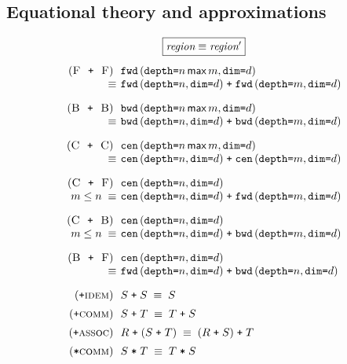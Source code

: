 \documentclass[9pt]{sigplanconf}
\theoremstyle{definition}
\newcommand{\term}[1]{\texttt{#1}}
\newcommand{\stenFwdS}[2]{\term{fwd} \, (\term{depth=}#1,
  \term{dim=}#2)}
\newcommand{\stenBwdS}[2]{\term{bwd} \, (\term{depth=}#1,
  \term{dim=}#2)}
\newcommand{\stenCenS}[2]{\term{cen} \, (\term{depth=}#1,
  \term{dim=}#2)}
\begin{document}
\subsection{Equational theory and approximations}
\label{sec:eqs}

\begin{figure}
\begin{align*}
\setlength{\arraycolsep}{0.05em}
\begin{array}{c}
\framebox{$\textit{region} \equiv \textit{region}'$} \\[1em]
\begin{array}{rll}
(\textsc{F\; \texttt{+} \;F}) \;\; &
\stenFwdS{n \, \textsf{max} \, m}{d} \\
 \equiv \; & \stenFwdS{n}{d} \; \texttt{+} \; \stenFwdS{m}{d} \\[1em]
%
(\textsc{B\; \texttt{+} \;B}) \;\; &
\stenBwdS{n \, \textsf{max} \, m}{d} \\
 \equiv \; & \stenBwdS{n}{d} \; \texttt{+} \; \stenBwdS{m}{d} \\[1em]
%
(\textsc{C\; \texttt{+} \;C}) \;\; &
\stenCenS{n \, \textsf{max} \, m}{d} \\
\equiv \; & \stenCenS{n}{d} \; \texttt{+} \; \stenCenS{m}{d} \\[1em]
%
(\textsc{C\; \texttt{+} \;F}) \;\; & \stenCenS{n}{d} \\
\textit{$m \leq n$} \; \equiv \; & \stenCenS{n}{d} \; \texttt{+} \;
                      \stenFwdS{m}{d} \\[1em]
%
(\textsc{C\; \texttt{+} \;B}) \;\; &
\stenCenS{n}{d} \\
\textit{$m \leq n$} \; \equiv \; & \stenCenS{n}{d} \; \texttt{+} \;
                      \stenBwdS{m}{d} \\[1em]
(\textsc{B\; \texttt{+} \;F}) \;\; &
\stenCenS{n}{d} \\
\equiv \; & \stenFwdS{n}{d} \; \texttt{+} \; \stenBwdS{n}{d} \\[1em]
%
(\texttt{+}\textsc{idem}) \;\; & S \; \texttt{+} \; S \; \equiv \; S \\[0.5em]
%
(\texttt{+}\textsc{comm}) \;\; & S \; \texttt{+} \; T \; \equiv \; T \;
                       \texttt{+} \; S \\[0.5em]
%
(\texttt{+}\textsc{assoc}) \;\; & R \; \texttt{+} \; (S \; \texttt{+} \; T) \; \equiv \; (R \;
                       \texttt{+} \; S) \; \texttt{+} \; T \\[0.5em]
(\texttt{*}\textsc{comm}) \;\; & S \; \texttt{*} \; T \; \equiv \; T \;
                       \texttt{*} \; S \\[0.5em]

\end{array}
\end{array}
\end{align*}
\end{figure}
\end{document}
